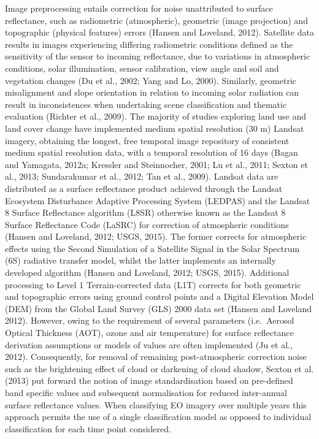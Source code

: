 \documentclass[]{book}
\begin{document}
Image preprocessing entails correction for noise unattributed to surface
reflectance, such as radiometric (atmospheric), geometric (image
projection) and topographic (physical features) errors (Hansen and
Loveland, 2012). Satellite data results in images experiencing differing
radiometric conditions defined as the sensitivity of the sensor to
incoming reflectance, due to variations in atmospheric conditions, solar
illumination, sensor calibration, view angle and soil and vegetation
changes (Du et al., 2002; Yang and Lo, 2000). Similarly, geometric
misalignment and slope orientation in relation to incoming solar
radiation can result in inconsistences when undertaking scene
classification and thematic evaluation (Richter et al., 2009). The
majority of studies exploring land use and land cover change have
implemented medium spatial resolution (30 m) Landsat imagery, obtaining
the longest, free temporal image repository of consistent medium spatial
resolution data, with a temporal resolution of 16 days (Bagan and
Yamagata, 2012a; Kressler and Steinnocher, 2001; Lu et al., 2011; Sexton
et al., 2013; Sundarakumar et al., 2012; Tan et al., 2009). Landsat data
are distributed as a surface reflectance product achieved through the
Landsat Ecosystem Disturbance Adaptive Processing System (LEDPAS) and
the Landsat 8 Surface Reflectance algorithm (L8SR) otherwise known as
the Landsat 8 Surface Reflectance Code (LaSRC) for correction of
atmospheric conditions (Hansen and Loveland, 2012; USGS, 2015). The
former corrects for atmospheric effects using the Second Simulation of a
Satellite Signal in the Solar Spectrum (6S) radiative transfer model,
whilst the latter implements an internally developed algorithm (Hansen
and Loveland, 2012; USGS, 2015). Additional processing to Level 1
Terrain-corrected data (L1T) corrects for both geometric and topographic
errors using ground control points and a Digital Elevation Model (DEM)
from the Global Land Survey (GLS) 2000 data set (Hansen and Loveland
2012). However, owing to the requirement of several parameters
(i.e.~Aerosol Optical Thickness (AOT), ozone and air temperature) for
surface reflectance derivation assumptions or models of values are often
implemented (Ju et al., 2012). Consequently, for removal of remaining
post-atmospheric correction noise such as the brightening effect of
cloud or darkening of cloud shadow, Sexton et al. (2013) put forward the
notion of image standardisation based on pre-defined band specific
values and subsequent normalisation for reduced inter-annual surface
reflectance values. When classifying EO imagery over multiple years this
approach permits the use of a single classification model as opposed to
individual classification for each time point considered.
\end{document}
